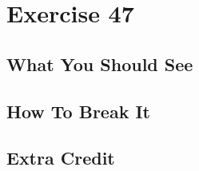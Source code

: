 \chapter{Exercise 47}


\section{What You Should See}


\section{How To Break It}


\section{Extra Credit}



